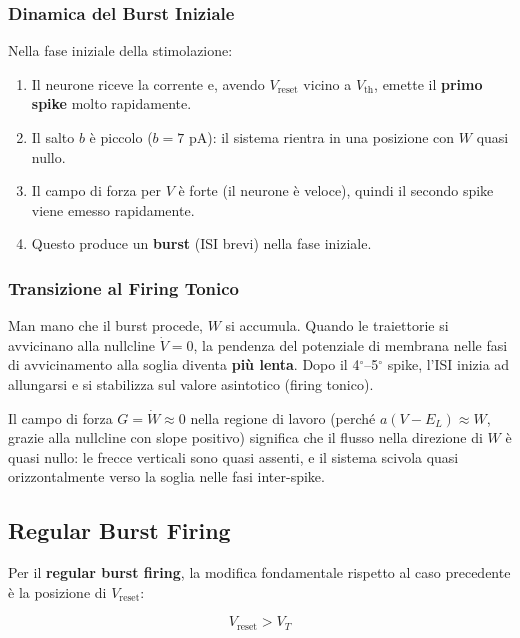 \subsubsection{Dinamica del Burst Iniziale}

Nella fase iniziale della stimolazione:

\begin{enumerate}
    \item Il neurone riceve la corrente e, avendo $V_{\text{reset}}$ vicino a $V_{\text{th}}$, emette il \textbf{primo spike} molto rapidamente.
    \item Il salto $b$ è piccolo ($b = 7$ pA): il sistema rientra in una posizione con $W$ quasi nullo.
    \item Il campo di forza per $V$ è forte (il neurone è veloce), quindi il secondo spike viene emesso rapidamente.
    \item Questo produce un \textbf{burst} (ISI brevi) nella fase iniziale.
\end{enumerate}

\subsubsection{Transizione al Firing Tonico}

Man mano che il burst procede, $W$ si accumula. Quando le traiettorie si avvicinano alla nullcline $\dot{V} = 0$, la pendenza del potenziale di membrana nelle fasi di avvicinamento alla soglia diventa \textbf{più lenta}. Dopo il 4$^\circ$–5$^\circ$ spike, l'ISI inizia ad allungarsi e si stabilizza sul valore asintotico (firing tonico).

Il campo di forza $G = \dot{W} \approx 0$ nella regione di lavoro (perché $a(V-E_L) \approx W$, grazie alla nullcline con slope positivo) significa che il flusso nella direzione di $W$ è quasi nullo: le frecce verticali sono quasi assenti, e il sistema scivola quasi orizzontalmente verso la soglia nelle fasi inter-spike.

\subsection{Regular Burst Firing}


Per il \textbf{regular burst firing}, la modifica fondamentale rispetto al caso precedente è la posizione di $V_{\text{reset}}$:

\begin{equation}
V_{\text{reset}} > V_T
\end{equation}

